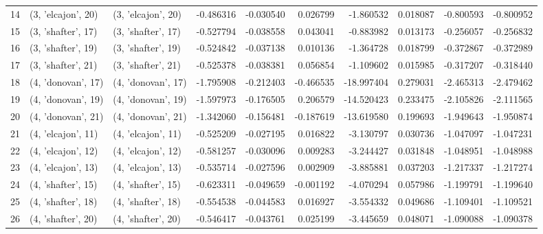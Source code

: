 \begin{tabular}{lllrrrrrrr}
14 &  (3, 'elcajon', 20) &  (3, 'elcajon', 20) & -0.486316 &  -0.030540 &  0.026799 &  -1.860532 &  0.018087 &  -0.800593 & -0.800952 \\
15 &  (3, 'shafter', 17) &  (3, 'shafter', 17) & -0.527794 &  -0.038558 &  0.043041 &  -0.883982 &  0.013173 &  -0.256057 & -0.256832 \\
16 &  (3, 'shafter', 19) &  (3, 'shafter', 19) & -0.524842 &  -0.037138 &  0.010136 &  -1.364728 &  0.018799 &  -0.372867 & -0.372989 \\
17 &  (3, 'shafter', 21) &  (3, 'shafter', 21) & -0.525378 &  -0.038381 &  0.056854 &  -1.109602 &  0.015985 &  -0.317207 & -0.318440 \\
18 &  (4, 'donovan', 17) &  (4, 'donovan', 17) & -1.795908 &  -0.212403 & -0.466535 & -18.997404 &  0.279031 &  -2.465313 & -2.479462 \\
19 &  (4, 'donovan', 19) &  (4, 'donovan', 19) & -1.597973 &  -0.176505 &  0.206579 & -14.520423 &  0.233475 &  -2.105826 & -2.111565 \\
20 &  (4, 'donovan', 21) &  (4, 'donovan', 21) & -1.342060 &  -0.156481 & -0.187619 & -13.619580 &  0.199693 &  -1.949643 & -1.950874 \\
21 &  (4, 'elcajon', 11) &  (4, 'elcajon', 11) & -0.525209 &  -0.027195 &  0.016822 &  -3.130797 &  0.030736 &  -1.047097 & -1.047231 \\
22 &  (4, 'elcajon', 12) &  (4, 'elcajon', 12) & -0.581257 &  -0.030096 &  0.009283 &  -3.244427 &  0.031848 &  -1.048951 & -1.048988 \\
23 &  (4, 'elcajon', 13) &  (4, 'elcajon', 13) & -0.535714 &  -0.027596 &  0.002909 &  -3.885881 &  0.037203 &  -1.217337 & -1.217274 \\
24 &  (4, 'shafter', 15) &  (4, 'shafter', 15) & -0.623311 &  -0.049659 & -0.001192 &  -4.070294 &  0.057986 &  -1.199791 & -1.199640 \\
25 &  (4, 'shafter', 18) &  (4, 'shafter', 18) & -0.554538 &  -0.044583 &  0.016927 &  -3.554332 &  0.049686 &  -1.109401 & -1.109521 \\
26 &  (4, 'shafter', 20) &  (4, 'shafter', 20) & -0.546417 &  -0.043761 &  0.025199 &  -3.445659 &  0.048071 &  -1.090088 & -1.090378 \\
\bottomrule
\end{tabular}
